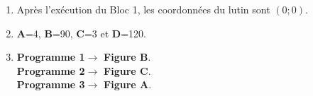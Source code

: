 
%
%
%
%
%
%

\begin{enumerate}
	\item Après l'exécution du Bloc 1, les coordonnées du lutin sont $(0;0)$.
	\item  \textbf{A}=4, \textbf{B}=90, \textbf{C}=3 et \textbf{D}=120.

	\item \textbf{Programme 1}$\to$ \textbf{Figure B}.\\
	\textbf{Programme 2}$\to$ \textbf{Figure C}.\\
	\textbf{Programme 3}$\to$ \textbf{Figure A}.
\end{enumerate}

